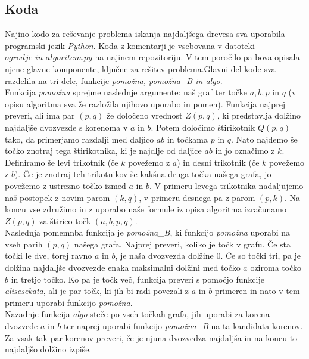 \documentclass[a4paper,12pt]{article}
\begin{document}
\subsection{Koda}

Najino kodo za reševanje problema iskanja najdaljšega drevesa sva uporabila programski jezik \emph{Python}.  Koda z komentarji je vsebovana v datoteki \emph{$ogrodje\_in\_algoritem.py$} na najinem repozitoriju. V tem poročilo pa bova opisala njene glavne komponente, ključne za rešitev problema.Glavni del kode sva razdelila na tri dele, funkcije \emph{pomožna, pomožna\_B in algo}. \\
Funkcija \emph{pomožna} sprejme naslednje argumente: naš graf ter točke $a, b, p$ in $q$ (v opisu algoritma sva že razložila njihovo uporabo in pomen). Funkcija najprej preveri, ali ima par $(p, q)$ že določeno vrednost $Z(p,q)$, ki predstavlja dolžino najdaljše dvozvezde s korenoma v $a$ in $b$. Potem določimo štirikotnik $Q(p,q)$ tako, da primerjamo razdalji med daljico $ab$ in točkama $p$ in $q$. Nato najdemo še točko znotraj tega štirikotnika, ki je najdlje od daljice $ab$ in jo označimo z $k$. Definiramo še levi trikotnik (če $k$ povežemo z $a$) in desni trikotnik (če $k$ povežemo z $b$). Če je znotraj teh trikotnikov še kakšna druga točka našega grafa, jo povežemo z ustrezno točko izmed $a$ in $b$. V primeru levega trikotnika nadaljujemo naš postopek z novim parom $(k,q)$, v primeru desnega pa z parom $(p, k)$. Na koncu vse združimo in z uporabo naše formule iz opisa algoritma izračunamo $Z(p,q)$ za štirico točk $(a, b, p, q)$. \\
Naslednja pomemnba funkcija je \emph{pomožna\_B}, ki funkcijo \emph{pomožna} uporabi na vseh parih $(p,q)$ našega grafa. Najprej preveri, koliko je točk v grafu. Če sta točki le dve, torej ravno $a$ in $b$, je naša dvozvezda dolžine $0$. Če so točki tri, pa je dolžina najdaljše dvozvezde enaka maksimalni dolžini med točko $a$ oziroma točko $b$ in tretjo točko. Ko pa je točk več, funkcija preveri s pomočjo funkcije \emph{alisesekata}, ali je par točk, ki jih bi radi povezali z $a$ in $b$ primeren in nato v tem primeru uporabi funkcijo \emph{pomožna}. \\
Nazadnje funkcija \emph{algo} steče po vseh točkah grafa, jih uporabi za korena dvozvede $a$ in $b$ ter naprej uporabi funkcijo \emph{pomožna\_B} na ta kandidata korenov. Za vsak tak par korenov preveri, če je njuna dvozvedza najdaljša in na koncu to najdaljšo dolžino izpiše.   





	
\end{document}
